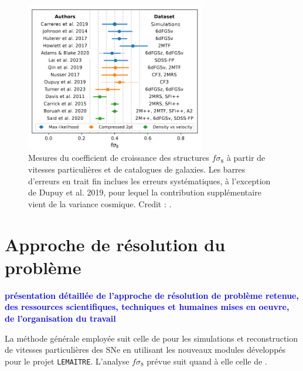 \documentclass{book}
\newcommand{\consignes}[1]{{\textcolor{blue}{\bf \large #1}}}
\def\lemaitre{\texttt{LEMAITRE}\xspace}
\begin{document}
\begin{figure}
    \centering
    \includegraphics[width=0.7\textwidth]{figures/Carreres_fig_11.png}
    \caption{Mesures du coefficient de croissance des structures $f\sigma_8$ à partir de vitesses particulières et de catalogues de galaxies. Les barres d'erreurs en trait fin inclues les erreurs systématiques, à l'exception de Dupuy et al. 2019, pour lequel la contribution supplémentaire vient de la variance cosmique. Credit : 
    \cite{carreres_growth-rate_2023}.}
    \label{fig:carreres_11}
\end{figure}


\section{Approche de résolution du problème}
\consignes{présentation détaillée de l’approche de résolution de problème retenue, des ressources scientifiques, techniques et humaines mises en oeuvre, de l’organisation du travail}

La méthode générale employée suit celle de \cite{carreres_growth-rate_2023} pour les simulations et reconstruction de vitesses particulières des SNe en utilisant les nouveaux modules développés pour le projet \lemaitre. L'analyse $f\sigma_8$ prévue suit quand à elle celle de \cite{boruah_cosmic_2020,stahl_peculiar-velocity_2021}.
\end{document}
